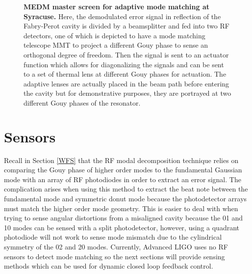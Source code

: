	\begin{figure}[h]
		\centering
		\caption[MEDM master screen for adaptive mode matching at Syracuse.]
		{\textbf{MEDM master screen for adaptive mode matching at Syracuse.}  
			Here, the demodulated error signal in reflection of the Fabry-Perot cavity is divided by a beamsplitter and fed into two RF detectors, one of which is depicted to have a mode matching telescope MMT to project a different Gouy phase to sense an orthogonal degree of freedom. Then the signal is sent to an actuator function which allows for diagonalizing the signals and can be sent to a set of thermal lens at different Gouy phases for actuation.  The adaptive lenses are actually placed in the beam path before entering the cavity but for demonstrative purposes, they are portrayed at two different Gouy phases of the resonator.
		}
		\label{fig:AMM_Master}
	\end{figure}

	\section{Sensors}
	Recall in Section \ref{WFS} that the RF modal decomposition technique relies on comparing the Gouy phase of higher order modes to the fundamental Gaussian mode with an array of RF photodiodes in order to extract an error signal. The complication arises when using this method to extract the beat note between the fundamental mode and symmetric donut mode because the photodetector arrays must match the higher order mode geometry.  This is easier to deal with when trying to sense angular distortions from a misaligned cavity because the 01 and 10 modes can be sensed with a split photodetector, however, using a quadrant photodiode will not work to sense mode mismatch due to the cylindrical symmetry of the 02 and 20 modes. Currently, Advanced LIGO uses no RF sensors to detect mode matching so the next sections will provide sensing methods which can be used for dynamic closed loop feedback control.
	
